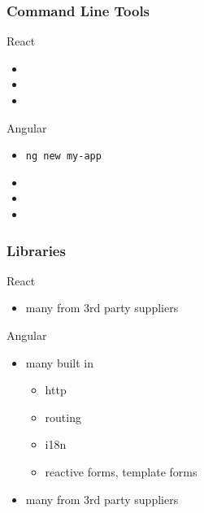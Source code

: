 \begin{frame}[fragile] \frametitle{Command Line Tools}
React
\begin{itemize}
  \item {}
  \item {}
  \item {}
\end{itemize}
\vspace{5mm}
Angular
\begin{itemize}
  \item \tt{ng new my-app}
  \item {}
  \item {}
  \item {}
\end{itemize}
\end{frame}

\begin{frame}[fragile] \frametitle{Libraries}
React
\begin{itemize}
  \item many from 3rd party suppliers
\end{itemize}
\vspace{5mm}
Angular
\begin{itemize}
  \item many built in
  \begin{itemize}
    \item http
    \item routing
    \item i18n
    \item reactive forms, template forms
  \end{itemize}
  \item many from 3rd party suppliers
\end{itemize}
\end{frame}


